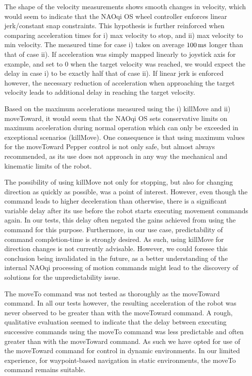 \documentclass[11pt,a4paper]{article}
\begin{document}
The shape of the velocity measurements shows smooth changes in velocity, which would seem to indicate that the NAOqi OS wheel controller enforces linear jerk/constant snap constraints. This hypothesis is further reinforced when comparing acceleration times for i) max velocity to stop, and ii) max velocity to min velocity. The measured time for case i) takes on average $\unit[100]{ms}$ longer than that of case ii). If acceleration was simply mapped linearly to joystick axis for example, and set to 0 when the target velocity was reached, we would expect the delay in case i) to be exactly half that of case ii). If linear jerk is enforced however, the necessary reduction of acceleration when approaching the target velocity leads to additional delay in reaching the target velocity.


Based on the maximum accelerations measured using the i) killMove and ii) moveToward, it would seem that the NAOqi OS sets conservative limits on maximum acceleration during normal operation which can only be exceeded in exceptional scenarios (killMove). One consequence is that using maximum values for the moveToward Pepper control is not only safe, but almost always recommended, as its use does not approach in any way the mechanical and kinematic limits of the robot.


The possibility of using killMove not only for stopping, but also for changing direction as quickly as possible, was a point of interest. However, even though the command leads to higher deceleration than otherwise, there is a significant variable delay after its use before the robot starts executing movement commands again. In our tests, this delay often negated the gains achieved from using the command for this purpose. Furthermore, in our use case, predictability of command completion-time is strongly desired. As such, using killMove for direction changes is not currently advisable. However, we could foresee this conclusion being invalidated in the future, as a better understanding of the internal NAOqi processing of motion commands might lead to the discovery of solutions for the unpredictability issue.


The moveTo command was not tested as thoroughly as the moveToward command. In all our tests however, the resulting acceleration of the robot was never observed to be greater than with the moveToward command. A rough, qualitative evaluation seemed to indicate that the delay between executing successive commands using the moveTo command was less predictable and often greater than with the moveToward command. As such we have opted for use of the moveToward command for control in dynamic environments. In our limited experience, for waypoint-based navigation in static environments, the moveTo command remains suitable.
\end{document}

